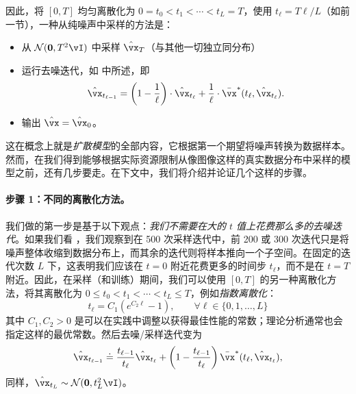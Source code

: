\documentclass[../../book-main.tex]{subfiles}
\begin{document}
因此，将 \([0, T]\) 均匀离散化为 \(0 = t_{0} < t_{1} < \cdots < t_{L} = T\)，使用 \(t_{\ell} = T\ell / L\)（如前一节），一种从纯噪声中采样的方法是：
\begin{itemize}
	\item 从 \(\dNorm(\vzero, T^{2}\vI)\) 中采样 \(\hat{\vx}_{T}\)（与其他一切独立同分布）
	\item 运行去噪迭代，如  中所述，即
		\begin{equation}\label{eq:denoising-iteration-basic}
		\hat{\vx}_{t_{\ell - 1}} = \bp{1 - \frac{1}{\ell}}\cdot\hat{\vx}_{t_{\ell}} + \frac{1}{\ell}\cdot\bar{\vx}^{\ast}(t_{\ell}, \hat{\vx}_{t_{\ell}}).
	\end{equation}
	\item 输出 \(\hat{\vx} = \hat{\vx}_{0}\)。
\end{itemize}
这在概念上就是\textit{扩散模型}的全部内容，它根据第一个期望将噪声转换为数据样本。然而，在我们得到能够根据实际资源限制从像图像这样的真实数据分布中采样的模型之前，还有几步要走。在下文中，我们将介绍并论证几个这样的步骤。

\paragraph{步骤 1：不同的离散化方法。} 我们做的第一步是基于以下观点：\textit{我们不需要在大的 \(t\) 值上花费那么多的去噪迭代}。如果我们看 ，我们观察到在 500 次采样迭代中，前 200 或 300 次迭代只是将噪声整体收缩到数据分布上，而其余的迭代则将样本推向一个子空间。在固定的迭代次数 \(L\) 下，这表明我们应该在 \(t = 0\) 附近花费更多的时间步 \(t_{\ell}\)，而不是在 \(t = T\) 附近。因此，在采样（和训练）期间，我们可以使用 \([0, T]\) 的另一种离散化方法，将其离散化为 \(0 \leq t_{0} < t_{1} < \cdots < t_{L} \leq T\)，例如\textit{指数离散化}：
\begin{equation}\label{eq:denoising_exponential_discretization}
	t_{\ell} = C_{1}(e^{C_{2}\ell} - 1), \qquad \forall \ell \in \{0, 1, \dots, L\}
\end{equation}
其中 \(C_{1}, C_{2} > 0\) 是可以在实践中调整以获得最佳性能的常数；理论分析通常也会指定这样的最优常数。然后去噪/采样迭代变为
\begin{equation}\label{eq:denoising_iteration}
	\hat{\vx}_{t_{\ell - 1}} \doteq \frac{t_{\ell - 1}}{t_{\ell}}\hat{\vx}_{t_{\ell}} + \bp{1 - \frac{t_{\ell - 1}}{t_{\ell}}}\bar{\vx}^{\ast}(t_{\ell}, \hat{\vx}_{t_{\ell}}),
\end{equation}
同样，\(\hat{\vx}_{t_{L}} \sim \dNorm(\vzero, t_{L}^{2}\vI)\)。
\end{document}
